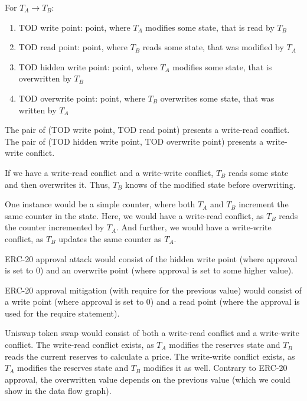 \documentclass[draft,final]{vutinfth} %
\begin{document}
    For $T_A \rightarrow T_B$:


    \begin{enumerate}
        \item TOD write point: point, where $T_A$ modifies some state, that is read by $T_B$
        \item TOD read point: point, where $T_B$ reads some state, that was modified by $T_A$
        \item TOD hidden write point: point, where $T_A$ modifies some state, that is overwritten by $T_B$
        \item TOD overwrite point: point, where $T_B$ overwrites some state, that was written by $T_A$
    \end{enumerate}

    The pair of (TOD write point, TOD read point) presents a write-read conflict. The pair of (TOD hidden write point, TOD overwrite point) presents a write-write conflict.

    If we have a write-read conflict and a write-write conflict, $T_B$ reads some state and then overwrites it. Thus, $T_B$ knows of the modified state before overwriting.

    One instance would be a simple counter, where both $T_A$ and $T_B$ increment the same counter in the state. Here, we would have a write-read conflict, as $T_B$ reads the counter incremented by $T_A$. And further, we would have a write-write conflict, as $T_B$ updates the same counter as $T_A$.

    ERC-20 approval attack would consist of the hidden write point (where approval is set to 0) and an overwrite point (where approval is set to some higher value).

    ERC-20 approval mitigation (with require for the previous value) would consist of a write point (where approval is set to 0) and a read point (where the approval is used for the require statement).

    Uniswap token swap would consist of both a write-read conflict and a write-write conflict. The write-read conflict exists, as $T_A$ modifies the reserves state and $T_B$ reads the current reserves to calculate a price. The write-write conflict exists, as $T_A$ modifies the reserves state and $T_B$ modifies it as well. Contrary to ERC-20 approval, the overwritten value depends on the previous value (which we could show in the data flow graph).
\end{document}

